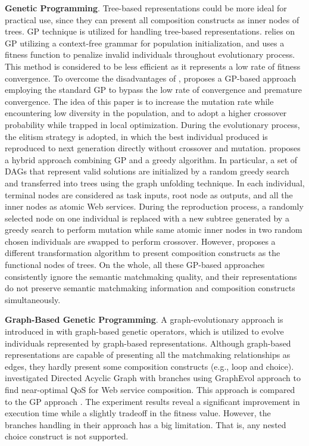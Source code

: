 \textbf{Genetic Programming}.
Tree-based representations could be more ideal for practical use, since they can present all composition constructs as inner nodes of trees. GP technique is utilized for handling tree-based representations. \cite {rodriguez2010composition} relies on GP utilizing a context-free grammar for population initialization, and uses a fitness function to penalize invalid individuals throughout evolutionary process. This method is considered to be less efficient as it represents a low rate of fitness convergence. To overcome the disadvantages of \cite {rodriguez2010composition}, \cite{yu2013adaptive} proposes a GP-based approach employing the standard GP to bypass the low rate of convergence and premature convergence. The idea of this paper is to increase the mutation rate while encountering low diversity in the population, and to adopt a higher crossover probability while trapped in local optimization.  During the evolutionary process, the elitism strategy is adopted, in which the best individual produced is reproduced to next generation directly without crossover and mutation. \cite{ma2015hybrid} proposes a hybrid approach combining GP and a greedy algorithm. In particular, a set of DAGs that represent valid solutions are initialized by a random greedy search and transferred into trees using the graph unfolding technique.  In each individual,  terminal nodes are considered as task inputs,  root node as  outputs, and all the inner nodes as atomic Web services. During the reproduction process,  a randomly selected node on one individual is replaced with a new subtree generated by a greedy search to perform mutation while same atomic inner nodes in two random chosen individuals are swapped to perform crossover. However, \cite{da2016genetic} proposes a different transformation algorithm to present composition constructs as the functional nodes of trees. On the whole, all these GP-based approaches \cite{ma2015hybrid,rodriguez2010composition,da2016genetic,yu2013adaptive} consistently ignore the semantic matchmaking quality, and their representations do not preserve semantic matchmaking information and composition constructs simultaneously. 

\textbf{Graph-Based Genetic Programming}.
A graph-evolutionary approach is introduced in \cite{da2015graphevol} with graph-based genetic operators, which is utilized to evolve individuals represented by graph-based representations. Although graph-based representations are capable of presenting all the matchmaking relationships as edges, they hardly present some composition constructs (e.g., loop and choice). \cite{da2016handling} investigated Directed Acyclic Graph with branches using GraphEvol approach \cite{da2015graphevol} to find near-optimal QoS for Web service composition. This approach is compared to the GP approach \cite{da2015gp}. The experiment results reveal a significant improvement in execution time while a slightly tradeoff in the fitness value. However, the branches handling in their approach has a big limitation. That is, any nested choice construct is not supported.


